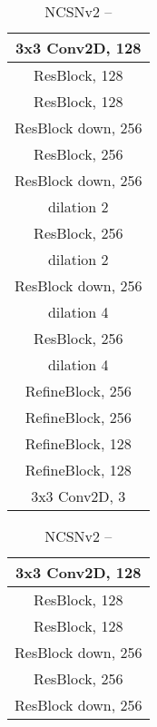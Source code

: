 \documentclass{article}
\begin{document}
\begin{table}[H]
    \centering
    \caption{The architectures of NCSNv2 for images of various resolutions.}\label{tab:ncsnv2}
    \begin{subtable}[t]{0.3\linewidth}
        \centering
        \caption{NCSNv2 --}\label{tab:ncsnv2_small_arch}
        \begin{tabular}{c}
        \toprule \toprule
        3x3 Conv2D, 128\\
        \midrule
        ResBlock, 128\\
        \midrule
        ResBlock, 128 \\
        \midrule
        ResBlock down, 256\\
        \midrule
        ResBlock, 256\\
        \midrule
        ResBlock down, 256\\ dilation 2\\
        \midrule
        ResBlock, 256\\ dilation 2\\
        \midrule
        ResBlock down, 256\\ dilation 4\\
        \midrule
        ResBlock, 256\\ dilation 4\\
        \midrule
        RefineBlock, 256\\
        \midrule
        RefineBlock, 256\\
        \midrule
        RefineBlock, 128\\
        \midrule
        RefineBlock, 128\\
        \midrule
        3x3 Conv2D, 3\\
        \bottomrule
        \end{tabular}
    \end{subtable}
    \hfill
    \begin{subtable}[t]{0.3\linewidth}
        \centering
        \caption{NCSNv2 --}
        \begin{tabular}{c}
        \toprule \toprule
        3x3 Conv2D, 128\\
        \midrule
        ResBlock, 128\\
        \midrule
        ResBlock, 128 \\
        \midrule
        ResBlock down, 256\\
        \midrule
        ResBlock, 256\\
        \midrule
        ResBlock down, 256\\

\end{tabular}
\end{subtable}
\end{table}
\end{document}
